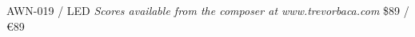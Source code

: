 \documentclass[11pt]{report}
\begin{document}
\null \vfill

AWN-019 / LED \hfill
\textit{Scores available from the composer at www.trevorbaca.com}
\hfill \$89 / \euro 89
\end{document}
